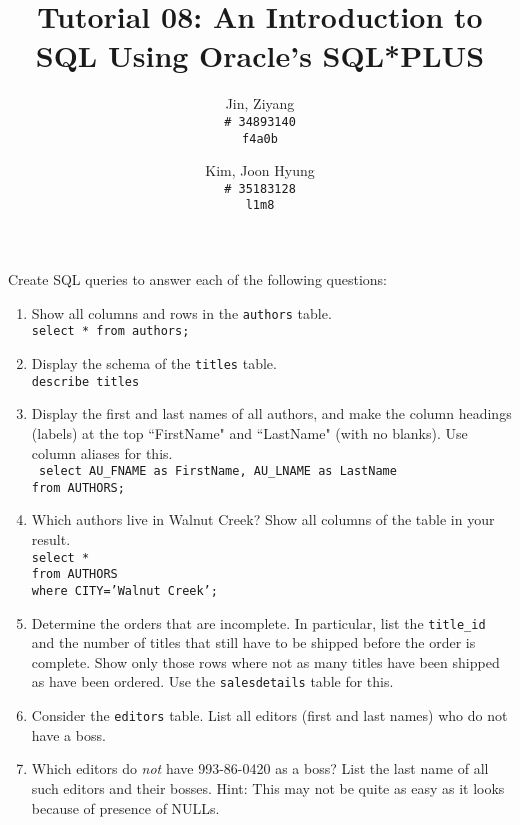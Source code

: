 \documentclass{article}
\title{Tutorial 08: An Introduction to SQL Using Oracle's SQL*PLUS}
\author{
	Jin, Ziyang\\
	\texttt{\# 34893140}\\
	\texttt{f4a0b}
	\and
	Kim, Joon Hyung\\
	\texttt{\# 35183128}\\
	\texttt{l1m8}
}
\begin{document}
	\maketitle

\noindent Create SQL queries to answer each of the following questions:

\begin{enumerate}
\item Show all columns and rows in the \texttt{authors} table.\\
	\texttt{select * from authors;}

\item Display the schema of the \texttt{titles} table.\\
	\texttt{describe titles}
	
\item Display the first and last names of all authors, and make the column headings (labels) at the top ``FirstName" and ``LastName" (with no blanks). Use column aliases for this.\\
	\texttt{ select AU\_FNAME as FirstName, AU\_LNAME as LastName } \\
	\texttt{from AUTHORS;}
	
\item Which authors live in Walnut Creek? Show all columns of the table in your result.\\
	\texttt{select *} \\
	\texttt{from AUTHORS} \\
	\texttt{where CITY='Walnut Creek';} \\
	
\item Determine the orders that are incomplete. In particular, list the \texttt{title\_id} and the number of titles that still have to be shipped before the order is complete. Show only those rows where not as many titles have been shipped as have been ordered. Use the \texttt{salesdetails} table for this.\\

\item Consider the \texttt{editors} table. List all editors (first and last names) who do not have a boss. \\

\item Which editors do \textit{not} have 993-86-0420 as a boss? List the last name of all such editors and their bosses. Hint: This may not be quite as easy as it looks because of presence of NULLs.\\


\end{enumerate}
\end{document}
